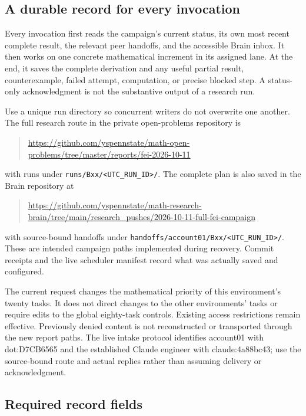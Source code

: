 \documentclass[11pt]{article}
\begin{document}
\subsection{A durable record for every invocation}

Every invocation first reads the campaign's current status, its own most recent complete result, the relevant peer handoffs, and the accessible Brain inbox. It then works on one concrete mathematical increment in its assigned lane. At the end, it saves the complete derivation and any useful partial result, counterexample, failed attempt, computation, or precise blocked step. A status-only acknowledgment is not the substantive output of a research run.

Use a unique run directory so concurrent writers do not overwrite one another. The full research route in the private open-problems repository is
\begin{quote}\small
\url{https://github.com/yspennstate/math-open-problems/tree/master/reports/fei-2026-10-11}
\end{quote}
with runs under \texttt{runs/Bxx/<UTC\_RUN\_ID>/}. The complete plan is also saved in the Brain repository at
\begin{quote}\small
\url{https://github.com/yspennstate/math-research-brain/tree/main/research_pushes/2026-10-11-full-fei-campaign}
\end{quote}
with source-bound handoffs under \texttt{handoffs/account01/Bxx/<UTC\_RUN\_ID>/}. These are intended campaign paths implemented during recovery. Commit receipts and the live scheduler manifest record what was actually saved and configured.

The current request changes the mathematical priority of this environment's twenty tasks. It does not direct changes to the other environments' tasks or require edits to the global eighty-task controls. Existing access restrictions remain effective. Previously denied content is not reconstructed or transported through the new report paths. The live intake protocol identifies account01 with dot:D7CB6565 and the established Claude engineer with claude:4a88bc43; use the source-bound route and actual replies rather than assuming delivery or acknowledgment.

\subsection{Required record fields}
\end{document}
